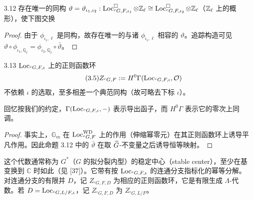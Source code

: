 \begin{prop}{3.12}
存在唯一的同构 $\vartheta=\vartheta_{\iota_1,\iota_2}:\operatorname{Loc}^{\square}_{{}^cG,F,\iota_1}\otimes\mathbb{Z}_\ell\cong\operatorname{Loc}^{\square}_{{}^cG,F,\iota_2}\otimes\mathbb{Z}_\ell$（$\mathbb{Z}_\ell$ 上的概形），使下图交换
\begin{center}
\end{center}
\end{prop}

\begin{proof}
由于 $\phi_{\iota_i,\ell}$ 是同构，故存在唯一的与诸 $\phi_{\iota_i,\ell}$ 相容的 $\vartheta$。追踪构造可见 $\vartheta\circ\phi_{\iota_1,\mathbb Q_\ell}=\phi_{\iota_2,\mathbb Q_\ell}\circ\bar\vartheta$。
\end{proof}

\begin{cor}{3.13}
$\operatorname{Loc}_{{}^cG,F,\iota}$ 上的正则函数环
\begin{equation*}\tag{3.5}
Z_{{}^cG,F}:=H^0\Gamma(\operatorname{Loc}_{{}^cG,F,\iota},\mathcal O)
\end{equation*}
不依赖 $\iota$ 的选取，至多相差一个典范同构（故可略去下标 $\iota$）。
\end{cor}

回忆按我们的约定，$\Gamma(\operatorname{Loc}_{{}^cG,F,\iota},-)$ 表示导出函子，而 $H^0\Gamma$ 表示它的零次上同调。

\begin{proof}
事实上，$\mathbb G_m$ 在 $\operatorname{Loc}^{\mathrm{WD}}_{{}^cG,F}$ 上的作用（伸缩幂零元）在其正则函数环上诱导平凡作用。因此命题 3.12 中的 $\bar\vartheta$ 在取 $\widehat{G}$-不变量之后诱导恒等映射。
\end{proof}

这个代数通常称为 $G^*$（$G$ 的拟分裂内型）的稳定中心（stable center），至少在基变换到 $\mathbb C$ 时如此（见 [37]）。它带有按 $\operatorname{Loc}_{{}^cG,F,\iota}$ 的连通分支指标化的幂等分解。对连通分支的有限并 $D$，记 $Z_{{}^cG,F,D}$ 为相应的正则函数环，它是有限生成 $\Lambda$-代数。若 $D=\operatorname{Loc}_{{}^cG,L/F,\iota}$，记 $Z_{{}^cG,F,D}$ 为 $Z_{{}^cG,L/F}$。

